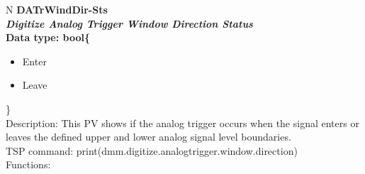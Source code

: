 \documentclass[openany]{article}
\begin{document}
		\begin{tabular}{N}
			\hline
			\bfseries DATrWindDir-Sts\label{pv:datrwinddir-sts} \\ \hline
			\emph{Digitize Analog Trigger Window Direction Status} \\
			Data type: bool\{\begin{itemize}[noitemsep]
				\small
				\item[] Enter
				\item[] Leave
			\end{itemize}\} \\
			Description: This PV shows if the analog trigger occurs when the signal enters or leaves the defined upper and lower analog signal level boundaries. \\
			TSP command: print(dmm.digitize.analogtrigger.window.direction) \\
			Functions: \\
			\arrayrulecolor{\FuncTableBorderColor}

		\end{tabular}
\end{document}
